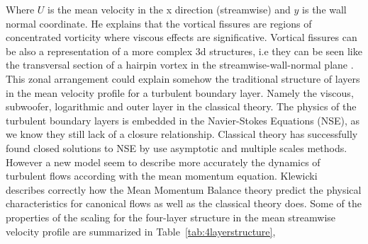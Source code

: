 \documentclass[aps,reprint,amsmath,amssymb,pra]{revtex4-1}%
\begin{document}
Where $U$ is the mean velocity in the x direction (streamwise) and $y$ is the wall normal coordinate.
He explains that the vortical fissures are regions of concentrated vorticity where viscous effects are significative. Vortical fissures can be also a representation of a more complex 3d structures, i.e they can be seen like the transversal section of a hairpin vortex in the streamwise-wall-normal plane \cite{amt2000}. This zonal arrangement could explain somehow the traditional structure of layers in the mean velocity profile for a turbulent boundary layer. Namely the viscous, subwoofer, logarithmic and outer layer in  the classical theory\citep{tenelumley}. The physics of the turbulent boundary layers is embedded in the Navier-Stokes Equations (NSE), as we know they still lack of a closure relationship. Classical theory has successfully found closed solutions to NSE by use asymptotic and multiple scales methods. However a new model seem to describe more accurately the dynamics of turbulent flows according with the mean momentum equation. Klewicki~\citep{Klewickimmb} describes correctly how the Mean Momentum Balance theory predict the physical characteristics for canonical flows as well as the classical theory does. Some of the properties of the scaling for the four-layer structure in the mean streamwise velocity profile are summarized in Table~\ref{tab:4layerstructure},
\end{document}
